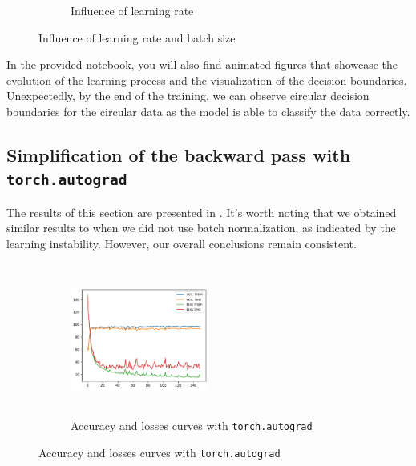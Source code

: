 \begin{figure}[H]
\begin{subfigure}{0.45\textwidth}
        \caption{Influence of learning rate}
        \label{subfig:manual_lr}
    \end{subfigure}
    \caption{Influence of learning rate and batch size}
    \label{fig:manual_bs_lr}
\end{figure}

In the provided notebook, you will also find animated figures that showcase the evolution of the learning process and the visualization of the decision boundaries. Unexpectedly, by the end of the training, we can observe circular decision boundaries for the circular data as the model is able to classify the data correctly.

\subsection{Simplification of the backward pass with \texttt{torch.autograd}}

The results of this section are presented in . It's worth noting that we obtained similar results to when we did not use batch normalization, as indicated by the learning instability. However, our overall conclusions remain consistent.


\begin{figure}[H]
    \centering
    \begin{subfigure}{\textwidth}
        \centering
        \includegraphics[width=0.5\textwidth, height=5cm]{figs/NN/autograd_acc_loss.pdf}
        \caption{Accuracy and losses curves with \texttt{torch.autograd}}
        \label{subfig:autograd_acc_loss}
    \end{subfigure}
\end{figure}

